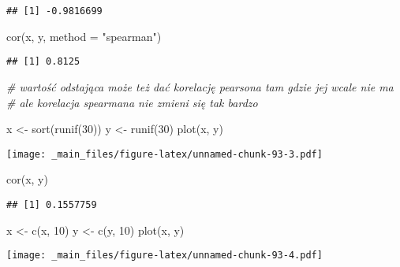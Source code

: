 \documentclass[
]{book}
\newenvironment{Shaded}{\begin{snugshade}}{\end{snugshade}}
\newcommand{\AttributeTok}[1]{\textcolor[rgb]{0.77,0.63,0.00}{#1}}
\newcommand{\CommentTok}[1]{\textcolor[rgb]{0.56,0.35,0.01}{\textit{#1}}}
\newcommand{\DecValTok}[1]{\textcolor[rgb]{0.00,0.00,0.81}{#1}}
\newcommand{\FunctionTok}[1]{\textcolor[rgb]{0.00,0.00,0.00}{#1}}
\newcommand{\NormalTok}[1]{#1}
\newcommand{\OtherTok}[1]{\textcolor[rgb]{0.56,0.35,0.01}{#1}}
\newcommand{\StringTok}[1]{\textcolor[rgb]{0.31,0.60,0.02}{#1}}
\begin{document}
\begin{verbatim}
## [1] -0.9816699
\end{verbatim}

\begin{Shaded}
\begin{Highlighting}[]
\FunctionTok{cor}\NormalTok{(x, y, }\AttributeTok{method =} \StringTok{"spearman"}\NormalTok{)}
\end{Highlighting}
\end{Shaded}

\begin{verbatim}
## [1] 0.8125
\end{verbatim}

\begin{Shaded}
\begin{Highlighting}[]
\CommentTok{\# wartość odstająca może też dać korelację pearsona tam gdzie jej wcale nie ma}
\CommentTok{\# ale korelacja spearmana nie zmieni się tak bardzo}

\NormalTok{x }\OtherTok{\textless{}{-}} \FunctionTok{sort}\NormalTok{(}\FunctionTok{runif}\NormalTok{(}\DecValTok{30}\NormalTok{))}
\NormalTok{y }\OtherTok{\textless{}{-}} \FunctionTok{runif}\NormalTok{(}\DecValTok{30}\NormalTok{)}
\FunctionTok{plot}\NormalTok{(x, y)}
\end{Highlighting}
\end{Shaded}

\texttt{[image: \_main\_files/figure-latex/unnamed-chunk-93-3.pdf]}

\begin{Shaded}
\begin{Highlighting}[]
\FunctionTok{cor}\NormalTok{(x, y)}
\end{Highlighting}
\end{Shaded}

\begin{verbatim}
## [1] 0.1557759
\end{verbatim}

\begin{Shaded}
\begin{Highlighting}[]
\NormalTok{x }\OtherTok{\textless{}{-}} \FunctionTok{c}\NormalTok{(x, }\DecValTok{10}\NormalTok{)}
\NormalTok{y }\OtherTok{\textless{}{-}} \FunctionTok{c}\NormalTok{(y, }\DecValTok{10}\NormalTok{)}
\FunctionTok{plot}\NormalTok{(x, y)}
\end{Highlighting}
\end{Shaded}

\texttt{[image: \_main\_files/figure-latex/unnamed-chunk-93-4.pdf]}
\end{document}
